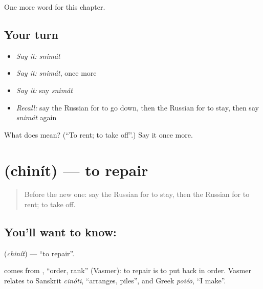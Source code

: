 \begin{grammarlens}[title={What you've built}]
One more word for this chapter.
\end{grammarlens}

\subsection*{Your turn}
\begin{itemize}
\raggedright
  \item \emph{Say it:} \emph{snimát}
  \item \emph{Say it:} \emph{snimát}, once more
  \item \emph{Say it:} say \emph{snimát}
  \item \emph{Recall:} say the Russian for to go down, then the Russian for to stay, then say \emph{snimát} again
\end{itemize}

\begin{tcolorbox}[breakable,colback=teal!4,colframe=teal!35!black,title={Before you move on}]
What does  mean? (\textquotedblleft{}To rent; to take off\textquotedblright{}.) Say it once more.
\end{tcolorbox}
\section[\texorpdfstring{\ru{чинить} (chinít)}{чинить (chinít)}]{ (chinít) — to repair}

\label{lesson:RU-C133-to-repair}



\begin{quote}
Before the new one: say the Russian for to stay, then the Russian for to rent; to take off.
\end{quote}

\subsection*{You'll want to know: }
\textbf{} (\emph{chinít}) — \textquotedblleft{}to repair\textquotedblright{}.

\begin{cousinweb}
\textbf{} comes from \emph{}, \textquotedblleft{}order, rank\textquotedblright{} (Vasmer): to repair is to put back in order. Vasmer relates \emph{} to Sanskrit \emph{cinóti}, \textquotedblleft{}arranges, piles\textquotedblright{}, and Greek \emph{poiéō}, \textquotedblleft{}I make\textquotedblright{}.
\end{cousinweb}

